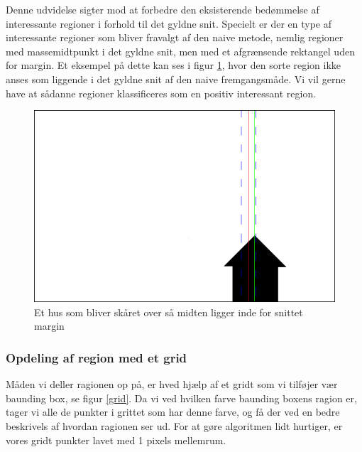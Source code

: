 {
Denne udvidelse sigter mod at forbedre den eksisterende bedømmelse af
interessante regioner i forhold til det gyldne snit. Specielt er der
en type af interessante regioner som bliver fravalgt af den naive
metode, nemlig regioner med massemidtpunkt i det gyldne snit, men med et
afgrænsende rektangel uden for margin. Et eksempel på dette kan ses i
figur \ref{hus}, hvor den sorte region ikke anses som liggende i det
gyldne snit af den naive fremgangsmåde. Vi vil gerne have at sådanne
regioner klassificeres som en positiv interessant region.

\begin{figure}[h]
	\begin{center}
		\includegraphics[scale=0.3,angle=0]{afsnit/vores_implementation/billeder/udvidet_loesning/husworks.png}
	\end{center}
	\caption[]{Et hus som bliver skåret over så midten ligger inde for snittet margin}
	\label{hus}
\end{figure}


\subsubsection{Opdeling af region med et grid}
Måden vi deller ragionen op på, er hved hjælp af et gridt som vi
tilføjer vær baunding box, se figur \ref{grid}. Da vi ved hvilken farve
baunding boxens ragion er, tager vi alle de punkter i grittet som har
denne farve, og få der ved en bedre beskrivels af hvordan ragionen ser
ud. For at gøre algoritmen lidt hurtiger, er vores gridt punkter lavet
med 1 pixels mellemrum.

}
